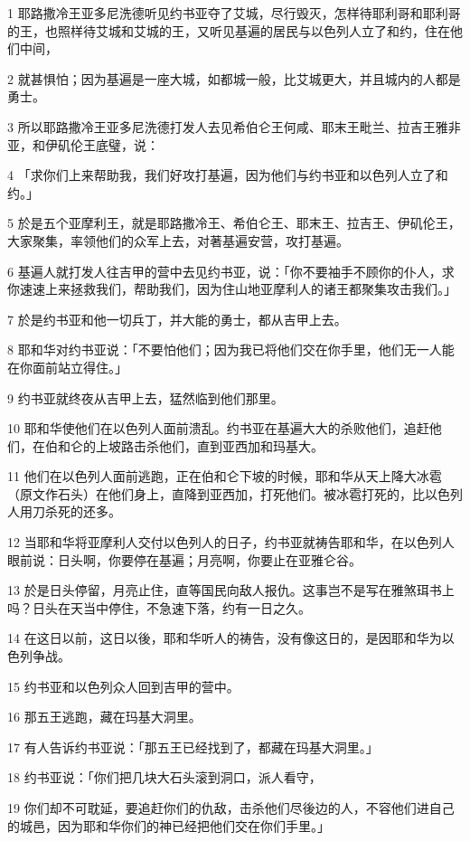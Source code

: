 \par 1 耶路撒冷王亚多尼洗德听见约书亚夺了艾城，尽行毁灭，怎样待耶利哥和耶利哥的王，也照样待艾城和艾城的王，又听见基遍的居民与以色列人立了和约，住在他们中间，
\par 2 就甚惧怕；因为基遍是一座大城，如都城一般，比艾城更大，并且城内的人都是勇士。
\par 3 所以耶路撒冷王亚多尼洗德打发人去见希伯仑王何咸、耶末王毗兰、拉吉王雅非亚，和伊矶伦王底璧，说：
\par 4 「求你们上来帮助我，我们好攻打基遍，因为他们与约书亚和以色列人立了和约。」
\par 5 於是五个亚摩利王，就是耶路撒冷王、希伯仑王、耶末王、拉吉王、伊矶伦王，大家聚集，率领他们的众军上去，对著基遍安营，攻打基遍。
\par 6 基遍人就打发人往吉甲的营中去见约书亚，说：「你不要袖手不顾你的仆人，求你速速上来拯救我们，帮助我们，因为住山地亚摩利人的诸王都聚集攻击我们。」
\par 7 於是约书亚和他一切兵丁，并大能的勇士，都从吉甲上去。
\par 8 耶和华对约书亚说：「不要怕他们；因为我已将他们交在你手里，他们无一人能在你面前站立得住。」
\par 9 约书亚就终夜从吉甲上去，猛然临到他们那里。
\par 10 耶和华使他们在以色列人面前溃乱。约书亚在基遍大大的杀败他们，追赶他们，在伯和仑的上坡路击杀他们，直到亚西加和玛基大。
\par 11 他们在以色列人面前逃跑，正在伯和仑下坡的时候，耶和华从天上降大冰雹（原文作石头）在他们身上，直降到亚西加，打死他们。被冰雹打死的，比以色列人用刀杀死的还多。
\par 12 当耶和华将亚摩利人交付以色列人的日子，约书亚就祷告耶和华，在以色列人眼前说：日头啊，你要停在基遍；月亮啊，你要止在亚雅仑谷。
\par 13 於是日头停留，月亮止住，直等国民向敌人报仇。这事岂不是写在雅煞珥书上吗？日头在天当中停住，不急速下落，约有一日之久。
\par 14 在这日以前，这日以後，耶和华听人的祷告，没有像这日的，是因耶和华为以色列争战。
\par 15 约书亚和以色列众人回到吉甲的营中。
\par 16 那五王逃跑，藏在玛基大洞里。
\par 17 有人告诉约书亚说：「那五王已经找到了，都藏在玛基大洞里。」
\par 18 约书亚说：「你们把几块大石头滚到洞口，派人看守，
\par 19 你们却不可耽延，要追赶你们的仇敌，击杀他们尽後边的人，不容他们进自己的城邑，因为耶和华你们的神已经把他们交在你们手里。」
